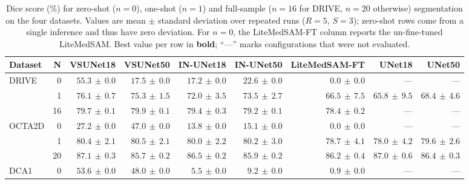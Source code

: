 \documentclass[twocolumn]{article}
\begin{document}
\begin{table}[t]
    \caption{Dice score (\%) for zero-shot ($n{=}0$), one-shot ($n{=}1$) and full-sample ($n{=}16$ for DRIVE, $n{=}20$ otherwise) segmentation on the four datasets. Values are mean $\pm$ standard deviation over repeated runs ($R{=}5$, $S{=}3$); zero-shot rows come from a single inference and thus have zero deviation. For $n{=}0$, the LiteMedSAM-FT column reports the un-fine-tuned LiteMedSAM. Best value per row in \textbf{bold}; ``---'' marks configurations that were not evaluated.}
    \label{tab:combined_fewshot_percent}
    \centering
    \begingroup
    \small
    \setlength{\tabcolsep}{4pt}
    \renewcommand{\arraystretch}{1.15}
\begin{tabular}{l r r r r r r r r }
\hline
\textbf{Dataset} & \textbf{N} & \textbf{VSUNet18} & \textbf{VSUNet50} & \textbf{IN-UNet18} & \textbf{IN-UNet50} & \textbf{LiteMedSAM-FT} & \textbf{UNet18} & \textbf{UNet50} \\
\hline
\multirow{3}{*}{DRIVE} & 0 & $\mathbf{55.3} \,\pm\, 0.0$ & $17.5 \,\pm\, 0.0$ & $17.2 \,\pm\, 0.0$ & $22.6 \,\pm\, 0.0$ & $0.0 \,\pm\, 0.0$ & --- & --- \\
 & 1 & $\mathbf{76.1} \,\pm\, 0.7$ & $75.3 \,\pm\, 1.5$ & $72.0 \,\pm\, 3.5$ & $73.5 \,\pm\, 2.7$ & $66.5 \,\pm\, 7.5$ & $65.8 \,\pm\, 9.5$ & $68.4 \,\pm\, 4.6$ \\
 & 16 & $79.7 \,\pm\, 0.1$ & $\mathbf{79.9} \,\pm\, 0.1$ & $79.4 \,\pm\, 0.3$ & $79.2 \,\pm\, 0.1$ & $78.4 \,\pm\, 0.2$ & --- & --- \\
\hline
\multirow{3}{*}{OCTA2D} & 0 & $27.2 \,\pm\, 0.0$ & $\mathbf{47.0} \,\pm\, 0.0$ & $13.8 \,\pm\, 0.0$ & $15.1 \,\pm\, 0.0$ & $0.0 \,\pm\, 0.0$ & --- & --- \\
 & 1 & $80.4 \,\pm\, 2.1$ & $\mathbf{80.5} \,\pm\, 2.1$ & $80.0 \,\pm\, 2.2$ & $80.2 \,\pm\, 3.0$ & $78.7 \,\pm\, 4.1$ & $78.0 \,\pm\, 4.2$ & $79.6 \,\pm\, 2.6$ \\
 & 20 & $\mathbf{87.1} \,\pm\, 0.3$ & $85.7 \,\pm\, 0.2$ & $86.5 \,\pm\, 0.2$ & $85.9 \,\pm\, 0.2$ & $86.2 \,\pm\, 0.4$ & $87.0 \,\pm\, 0.6$ & $86.4 \,\pm\, 0.3$ \\
\hline
\multirow{3}{*}{DCA1} & 0 & $\mathbf{53.6} \,\pm\, 0.0$ & $48.0 \,\pm\, 0.0$ & $5.5 \,\pm\, 0.0$ & $9.2 \,\pm\, 0.0$ & $0.9 \,\pm\, 0.0$ & --- & --- \\

\end{tabular}
\end{table}
\end{document}
